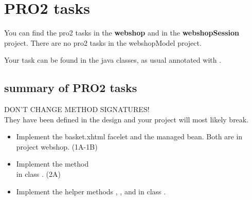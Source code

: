 \section{PRO2 tasks}

You can find the pro2 tasks in the \textbf{webshop} and in the \textbf{webshopSession} project.
There are no pro2 tasks in the webshopModel project.

Your task can be found in the java classes, as usual annotated with .

\subsection{summary of PRO2 tasks}

\begin{center}
{\Large  DON'T CHANGE METHOD SIGNATURES!}\\
They have been defined in the design and your project will most likely break.
\end{center}

\begin{itemize}
\item Implement the basket.xhtml facelet and the 
  managed bean. Both are in project webshop. (1A-1B) 
\item Implement the method \\ 
  in class . (2A) 
\item Implement the helper methods ,
  ,  and 
  in class .
\end{itemize}
